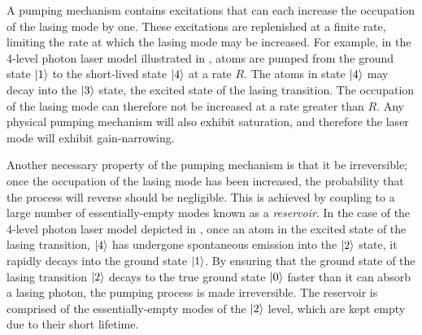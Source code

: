 A pumping mechanism contains excitations that can each increase the occupation of the lasing mode by one.  These excitations are replenished at a finite rate, limiting the rate at which the lasing mode may be increased.  For example, in the 4-level photon laser model illustrated in , atoms are pumped from the ground state ${\left|1\right>}$ to the short-lived state ${\left|4\right>}$ at a rate $R$.  The atoms in state ${\left|4\right>}$ may decay into the ${\left|3\right>}$ state, the excited state of the lasing transition.  The occupation of the lasing mode can therefore not be increased at a rate greater than $R$.  Any physical pumping mechanism will also exhibit saturation, and therefore the laser mode will exhibit gain-narrowing.

Another necessary property of the pumping mechanism is that it be irreversible; once the occupation of the lasing mode has been increased, the probability that the process will reverse should be negligible.  This is achieved by coupling to a large number of essentially-empty modes known as a \emph{reservoir}.  In the case of the 4-level photon laser model depicted in , once an atom in the excited state of the lasing transition, ${\left|4\right>}$ has undergone spontaneous emission into the ${\left|2\right>}$ state, it rapidly decays into the ground state ${\left|1\right>}$.  By ensuring that the ground state of the lasing transition ${\left|2\right>}$ decays to the true ground state ${\left|0\right>}$ faster than it can absorb a lasing photon, the pumping process is made irreversible.  The reservoir is comprised of the essentially-empty modes of the ${\left|2\right>}$ level, which are kept empty due to their short lifetime.

